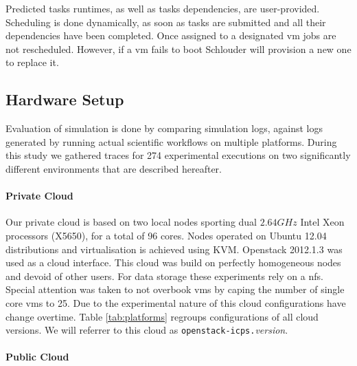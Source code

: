 Predicted  tasks runtimes,  as well  as tasks  dependencies, are  user-provided.
Scheduling is  done dynamically, as  soon as tasks  are submitted and  all their
dependencies have been completed. Once assigned to a designated \ac{vm} jobs are
not rescheduled. However, if a \ac{vm}  fails to boot Schlouder will provision a
new one to replace it.

\subsection{Hardware Setup}

Evaluation  of simulation  is done  by comparing  simulation logs,  against logs
generated by running  actual scientific workflows on  multiple platforms. During
this  study  we   gathered  traces  for  274  experimental   executions  on  two
significantly different environments that are described hereafter.


\paragraph{Private Cloud}

Our private cloud is based on two local nodes sporting dual $2.64GHz$ Intel Xeon
processors (X5650),  for a  total of  96 cores. Nodes  operated on  Ubuntu 12.04
distributions and virtualisation  is achieved using KVM.  Openstack 2012.1.3 was
used as a  cloud interface. This cloud was build  on perfectly homogeneous nodes
and  devoid  of other  users.  For  data storage  these  experiments  rely on  a
\ac{nfs}. Special  attention was taken  to not  overbook \acp{vm} by  caping the
number of  single core \acp{vm}  to 25. Due to  the experimental nature  of this
cloud configurations  have change  overtime. Table  \ref{tab:platforms} regroups
configurations  of  all cloud  versions.  We  will  referrer  to this  cloud  as
\texttt{openstack-icps.}\emph{version}.


\paragraph{Public Cloud}

